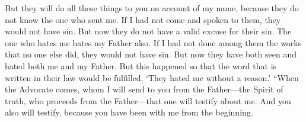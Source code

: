 \begin{biblechapter}
\verse But they will do all these things to you on account of my name, because they do not know the one who sent me.
\verse If I had not come and spoken to them, they would not have sin. But now they do not have a valid excuse for their sin.
\verse The one who hates me hates my Father also.
\verse If I had not done among them the works that no one else did, they would not have sin. But now they have both seen and hated both me and my Father.
\verse But this happened so that the word that is written in their law would be fulfilled, ‘They hated me without a reason.’
\verse “When the Advocate comes, whom I will send to you from the Father—the Spirit of truth, who proceeds from the Father—that one will testify about me.
\verse And you also will testify, because you have been with me from the beginning.
\end{biblechapter}

